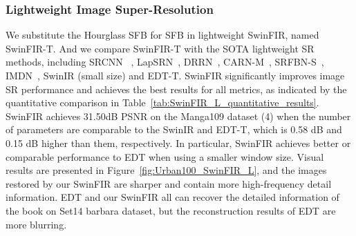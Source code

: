\documentclass[10pt,twocolumn,letterpaper]{article}
\begin{document}
\subsubsection{Lightweight Image Super-Resolution}
We substitute the Hourglass SFB for SFB in lightweight SwinFIR, named SwinFIR-T. And we compare SwinFIR-T with the SOTA lightweight SR methods, including SRCNN ~\cite{dong2015image}, LapSRN~\cite{lai2017deep}, DRRN~\cite{tai2017image}, CARN-M~\cite{2018Fast}, SRFBN-S~\cite{2019Feedback}, IMDN~\cite{2019Lightweight}, SwinIR (small size) and EDT-T. 
SwinFIR significantly improves image SR performance and achieves the best results for all metrics, as indicated by the quantitative comparison in Table~\ref{tab:SwinFIR_L_quantitative_results}. SwinFIR achieves 31.50dB PSNR on the Manga109 dataset (4) when the number of parameters are comparable to the SwinIR and EDT-T, which is 0.58 dB and 0.15 dB higher than them, respectively. 
In particular, SwinFIR achieves better or comparable performance to EDT when using a smaller window size. 
Visual results are presented in Figure~\ref{fig:Urban100_SwinFIR_L}, and the images restored by our SwinFIR are sharper and contain more high-frequency detail information. 
EDT and our SwinFIR all can recover the detailed information of the book on Set14 barbara dataset, but the reconstruction results of EDT are more blurring.
\end{document}

